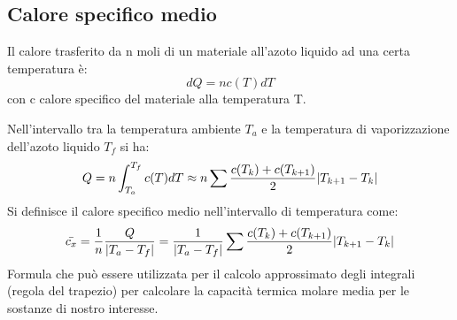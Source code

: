 \documentclass[a4paper,12pt]{article}
\begin{document}
\subsection{Calore specifico medio}

Il calore trasferito da n moli di un materiale all'azoto liquido ad una certa temperatura è:
\begin{equation*}
    dQ = nc(T)dT
\end{equation*}
con c calore specifico del materiale alla temperatura T.

Nell'intervallo tra la temperatura ambiente $T_a$ e la temperatura di vaporizzazione dell'azoto
liquido $T_f$ si ha:
\begin{equation*}
    Q = n \int_{T_a}^{T_f} c(T)dT \approx n \sum \frac{c(T_k) + c(T_{k+1})}{2} \abs{T_{k+1} - T_k}
\end{equation*}
Si definisce il calore specifico medio nell'intervallo di temperatura come:
\begin{equation*}
    \bar{c_x} = \frac{1}{n} \frac{Q}{\abs{T_a - T_f}} = \frac{1}{\abs{T_a - T_f}} \sum \frac{c(T_k) + c(T_{k+1})}{2} \abs{T_{k+1} - T_k}
\end{equation*}
Formula che può essere utilizzata per il calcolo approssimato degli integrali (regola del trapezio)
per calcolare la capacità termica molare media per le sostanze di nostro interesse.
\end{document}
